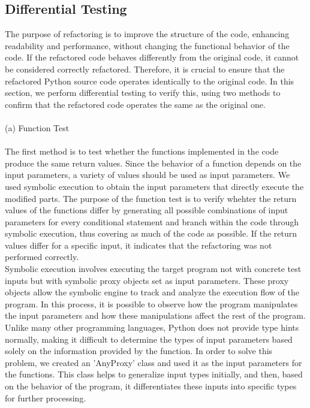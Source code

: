 \documentclass[11pt]{article}
\begin{document}
\subsection{Differential Testing}
The purpose of refactoring is to improve the structure of the code, enhancing readability and performance, without changing the functional behavior of the code. If the refactored code behaves differently from the original code, it cannot be considered correctly refactored. Therefore, it is crucial to ensure that the refactored Python source code operates identically to the original code. In this section, we perform differential testing to verify this, using two methods to confirm that the refactored code operates the same as the original one. \\ \\

(a) Function Test\\ \\
The first method is to test whether the functions implemented in the code produce the same return values. Since the behavior of a function depends on the input parameters, a variety of values should be used as input parameters. We used symbolic execution to obtain the input parameters that directly execute the modified parts. The purpose of the function test is to verify whehter the return values of the functions differ by generating all possible combinations of input parameters for every conditional statement and branch within the code through symbolic execution, thus covering as much of the code as possible. If the return values differ for a specific input, it indicates that the refactoring was not performed correctly. \\
Symbolic execution involves executing the target program not with concrete test inputs but with symbolic proxy objects set as input parameters. These proxy objects allow the symbolic engine to track and analyze the execution flow of the program. In this process, it is possible to observe how the program manipulates the input parameters and how these manipulations affect the rest of the program.
Unlike many other programming languages, Python does not provide type hints normally, making it difficult to determine the types of input parameters based solely on the information provided by the function. In order to solve this problem, we created an 'AnyProxy' class and used it as the input parameters for the functions. This class helps to generalize input types initially, and then, based on the behavior of the program, it differentiates these inputs into specific types for further processing.
\end{document}
